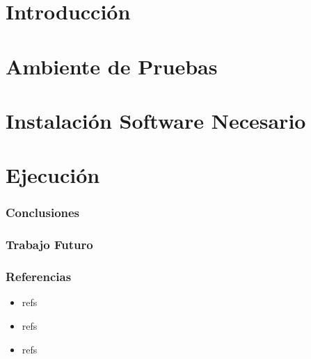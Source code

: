 \section{Introducción}

\section{Ambiente de Pruebas}

\section{Instalación Software Necesario}

\section{Ejecución}


\begin{frame}
\frametitle{Conclusiones}


\end{frame}

\begin{frame}
\frametitle{Trabajo Futuro}


\end{frame}

\begin{frame}
\frametitle{Referencias}
	\begin{itemize}
	\item refs
	\item refs
	\item refs
	\end{itemize}
\end{frame}

